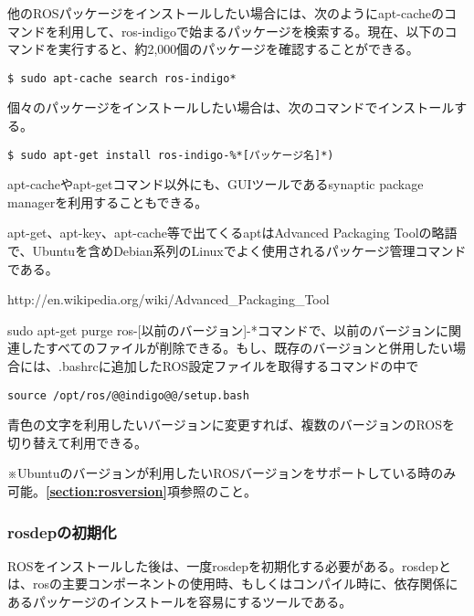\begin{exercise}[ROSパッケージのバイナリのインストール]
  他のROSパッケージをインストールしたい場合には、次のようにapt-cacheのコマンドを利用して、ros-indigoで始まるパッケージを検索する。現在、以下のコマンドを実行すると、約2,000個のパッケージを確認することができる。

  \begin{lstlisting}[language=ROS]
  $ sudo apt-cache search ros-indigo*
  \end{lstlisting}

  個々のパッケージをインストールしたい場合は、次のコマンドでインストールする。

  \begin{lstlisting}[language=ROS]
  $ sudo apt-get install ros-indigo-%*[パッケージ名]*)
  \end{lstlisting}

  apt-cacheやapt-getコマンド以外にも、GUIツールであるsynaptic package managerを利用することもできる。
\end{exercise}

\begin{exercise}
  apt-get、apt-key、apt-cache等で出てくるaptはAdvanced Packaging Toolの略語で、Ubuntuを含めDebian系列のLinuxでよく使用されるパッケージ管理コマンドである。

  http://en.wikipedia.org/wiki/Advanced\_Packaging\_Tool
\end{exercise}

\begin{exercise}[以前のバージョンのROSの削除と他のROSバージョンの併用]
  sudo apt-get purge ros-[以前のバージョン]-*コマンドで、以前のバージョンに関連したすべてのファイルが削除できる。もし、既存のバージョンと併用したい場合には、.bashrcに追加したROS設定ファイルを取得するコマンドの中で

  \begin{lstlisting}[moredelim={[is][keywordstyle]{@@}{@@}}]
source /opt/ros/@@indigo@@/setup.bash
  \end{lstlisting}

  青色の文字を利用したいバージョンに変更すれば、複数のバージョンのROSを切り替えて利用できる。

 ※Ubuntuのバージョンが利用したいROSバージョンをサポートしている時のみ可能。\textbf{\ref{section:rosversion}}項参照のこと。
\end{exercise}

\subsubsection{rosdepの初期化}
ROSをインストールした後は、一度rosdepを初期化する必要がある。rosdepとは、rosの主要コンポーネントの使用時、もしくはコンパイル時に、依存関係にあるパッケージのインストールを容易にするツールである。

